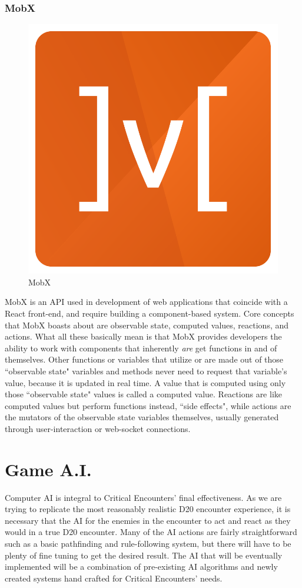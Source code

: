 \documentclass[12pt,a4paper]{report}
\begin{document}
			\subsubsection{MobX}
			\begin{figure}
				\includegraphics[scale=.17]{mobx}
				\caption{MobX}
				\label{fig: MobX}
			\end{figure}
			MobX is an API used in development of web applications that coincide with a React front-end, and require building a component-based system. Core concepts that MobX boasts about are observable state, computed values, reactions, and actions. What all these basically mean is that MobX provides developers the ability to work with components that inherently \textit{are} get functions in and of themselves. Other functions or variables that utilize or are made out of those ``observable state" variables and methods never need to request that variable's value, because it is updated in real time. A value that is computed using only those ``observable state" values is called a computed value. Reactions are like computed values but perform functions instead, ``side effects", while actions are the mutators of the observable state variables themselves, usually generated through user-interaction or web-socket connections.
	
	\newpage					
	\section{Game A.I.}
		Computer AI is integral to Critical Encounters' final effectiveness. As we are trying to replicate the most reasonably realistic D20 encounter experience, it is necessary that the AI for the enemies in the encounter to act and react as they would in a true D20 encounter. Many of the AI actions are fairly straightforward such as a basic pathfinding and rule-following system, but there will have to be plenty of fine tuning to get the desired result. The AI that will be eventually implemented will be a combination of pre-existing AI algorithms and newly created systems hand crafted for Critical Encounters' needs.
\end{document}
